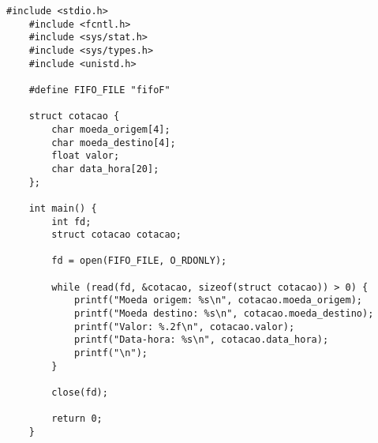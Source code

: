 \begin{lstlisting}[style=CStyle]
    #include <stdio.h>
    #include <fcntl.h>
    #include <sys/stat.h>
    #include <sys/types.h>
    #include <unistd.h>
    
    #define FIFO_FILE "fifoF"
    
    struct cotacao {
        char moeda_origem[4];
        char moeda_destino[4];
        float valor;
        char data_hora[20];
    };
    
    int main() {
        int fd;
        struct cotacao cotacao;
    
        fd = open(FIFO_FILE, O_RDONLY);
    
        while (read(fd, &cotacao, sizeof(struct cotacao)) > 0) {
            printf("Moeda origem: %s\n", cotacao.moeda_origem);
            printf("Moeda destino: %s\n", cotacao.moeda_destino);
            printf("Valor: %.2f\n", cotacao.valor);
            printf("Data-hora: %s\n", cotacao.data_hora);
            printf("\n");
        }
    
        close(fd);
    
        return 0;
    }
    
\end{lstlisting}